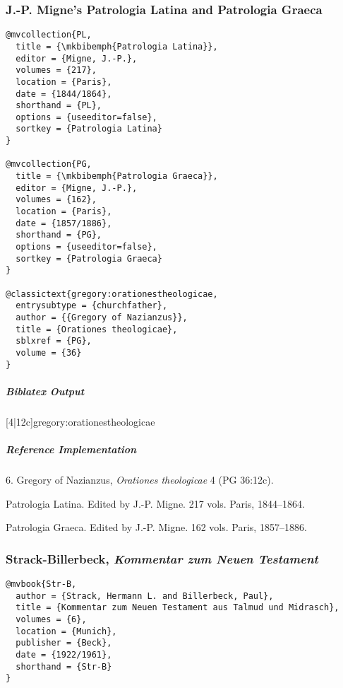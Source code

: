 \documentclass[a4paper]{article}
\newenvironment{biboutput}{%
  \subparagraph{Biblatex Output}
}{\color{black}}
\newenvironment{refimp}{%
  \subparagraph{Reference Implementation}
  \color{reference-colour}
  \rm
}{\par\color{black}}
\begin{document}
\subsubsection{J.-P. Migne's Patrologia Latina and Patrologia Graeca}

\begin{lstlisting}
@mvcollection{PL,
  title = {\mkbibemph{Patrologia Latina}},
  editor = {Migne, J.-P.},
  volumes = {217},
  location = {Paris},
  date = {1844/1864},
  shorthand = {PL},
  options = {useeditor=false},
  sortkey = {Patrologia Latina}
}

@mvcollection{PG,
  title = {\mkbibemph{Patrologia Graeca}},
  editor = {Migne, J.-P.},
  volumes = {162},
  location = {Paris},
  date = {1857/1886},
  shorthand = {PG},
  options = {useeditor=false},
  sortkey = {Patrologia Graeca}
}

@classictext{gregory:orationestheologicae,
  entrysubtype = {churchfather},
  author = {{Gregory of Nazianzus}},
  title = {Orationes theologicae},
  sblxref = {PG},
  volume = {36}
}
\end{lstlisting}

\begin{biboutput}
  [4|12c]{gregory:orationestheologicae}
\end{biboutput}

\begin{refimp}
  \hspace*{\bibindent}6. Gregory of Nazianzus, \emph{Orationes theologicae} 4
  (PG 36:12c).

  \hangindent\bibindent Patrologia Latina. Edited by J.-P. Migne. 217 vols.
  Paris, 1844–1864.

  \hangindent\bibindent Patrologia Graeca. Edited by J.-P. Migne. 162 vols.
  Paris, 1857–1886.


\end{refimp}

\subsubsection{Strack-Billerbeck, \emph{Kommentar zum Neuen Testament}}

\begin{lstlisting}
@mvbook{Str-B,
  author = {Strack, Hermann L. and Billerbeck, Paul},
  title = {Kommentar zum Neuen Testament aus Talmud und Midrasch},
  volumes = {6},
  location = {Munich},
  publisher = {Beck},
  date = {1922/1961},
  shorthand = {Str-B}
}
\end{lstlisting}
\end{document}
